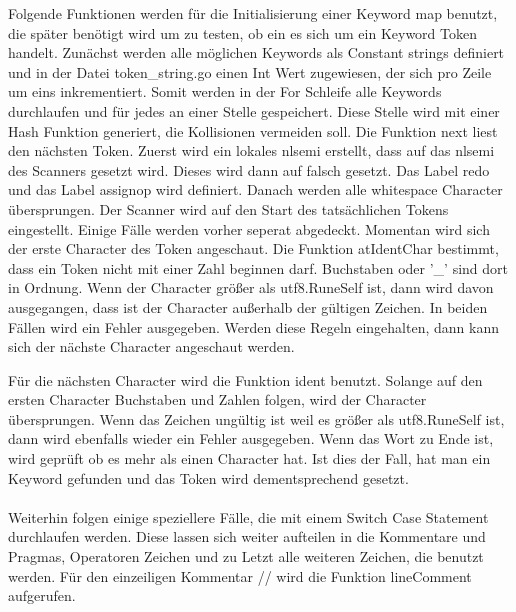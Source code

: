 Folgende Funktionen werden für die Initialisierung einer Keyword map benutzt, die später benötigt wird um zu testen, ob ein es sich um ein Keyword Token handelt. Zunächst werden alle möglichen Keywords als Constant strings definiert und in der Datei token\_string.go einen Int Wert zugewiesen, der sich pro Zeile um eins inkrementiert. Somit werden in der For Schleife alle Keywords durchlaufen und für jedes an einer Stelle gespeichert. Diese Stelle wird mit einer Hash Funktion generiert, die Kollisionen vermeiden soll. Die Funktion next liest den nächsten Token. Zuerst wird ein lokales nlsemi erstellt, dass auf das nlsemi des Scanners gesetzt wird. Dieses wird dann auf falsch gesetzt. Das Label redo und das Label assignop wird definiert. Danach werden alle whitespace Character übersprungen. Der Scanner wird auf den Start des tatsächlichen Tokens eingestellt. Einige Fälle werden vorher seperat abgedeckt. Momentan wird sich der erste Character des Token angeschaut. Die Funktion atIdentChar bestimmt, dass ein Token nicht mit einer Zahl beginnen darf. Buchstaben oder '\_' sind dort in Ordnung. Wenn der Character größer als utf8.RuneSelf ist, dann wird davon ausgegangen, dass ist der Character außerhalb der gültigen Zeichen. In beiden Fällen wird ein Fehler ausgegeben. Werden diese Regeln eingehalten, dann kann sich der nächste Character angeschaut werden.

Für die nächsten Character wird die Funktion ident benutzt. Solange auf den ersten Character Buchstaben und Zahlen folgen, wird der Character übersprungen. Wenn das Zeichen ungültig ist weil es größer als utf8.RuneSelf ist, dann wird ebenfalls wieder ein Fehler ausgegeben. 
Wenn das Wort zu Ende ist, wird geprüft ob es mehr als einen Character hat. Ist dies der Fall, hat man ein Keyword gefunden und das Token wird dementsprechend gesetzt.\\
\\Weiterhin folgen einige speziellere Fälle, die mit einem Switch Case Statement durchlaufen werden. Diese lassen sich weiter aufteilen in die Kommentare und Pragmas, Operatoren Zeichen und zu Letzt alle weiteren Zeichen, die benutzt werden.
Für den einzeiligen Kommentar // wird die Funktion lineComment aufgerufen.

